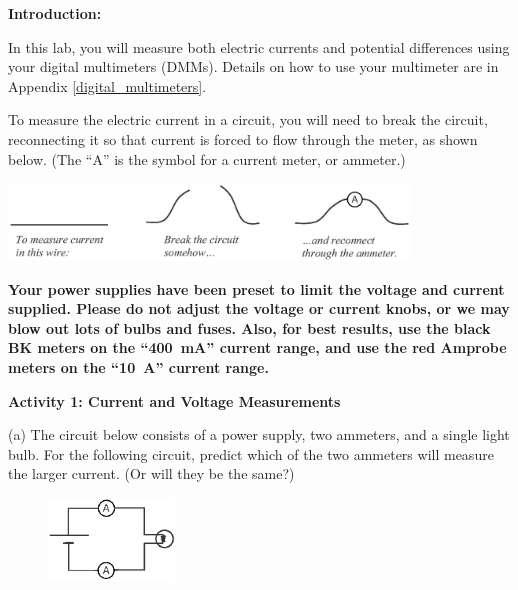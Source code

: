 \bigskip
\textbf{Introduction:}

In this lab, you will measure both electric currents and potential differences using your digital multimeters (DMMs).  Details on how to use your multimeter are in Appendix \ref{digital_multimeters}.

To measure the electric current in a circuit, you will need to break the circuit, reconnecting it so that current is forced to flow through the meter, as shown below.  (The ``A'' is the symbol for a current meter, or ammeter.)

\begin{center}
\includegraphics[width=0.8\textwidth]{electric_circuits/how_to_measure_current.eps}
\end{center}
\vspace{-0.2in}

\begin{newboxed}
\textbf{Your power supplies have been preset to limit the voltage and current supplied.  Please do not adjust the voltage or current knobs, or we may blow out lots of bulbs and fuses.  Also, for best results, use the black BK meters on the ``400~mA'' current range, and use the red Amprobe meters on the ``10~A'' current range.
}
\end{newboxed}

\vspace{0.1 in}
\textbf{Activity 1: Current and Voltage Measurements}

(a) The circuit below consists of a power supply, two ammeters, and a single light bulb.  For the following circuit, predict which of the two ammeters will measure the larger current.  (Or will they be the same?)

\begin{figure}
    \vspace{-0.4 in}
    \includegraphics[width=0.3\textwidth]{electric_circuits/circ_diag1.eps}
\end{figure}

